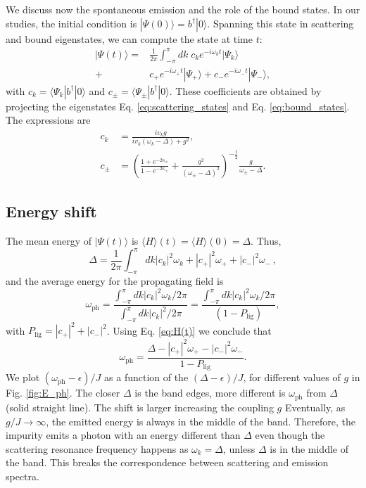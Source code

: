 \documentclass[aps,pra,twocolumn,floatfix,superscriptaddress]{revtex4-1}%
\begin{document}
We discuss now   the spontaneous emission and the role of the bound states.
In our studies, the  initial condition is $|\Psi(0)\rangle = b^\dagger |0\rangle$. Spanning this state in  scattering and bound eigenstates, we can compute the state at time $t$:
\begin{align}
|\Psi(t)\rangle = & \frac{1}{2\pi}\int_{-\pi}^\pi dk\;c_ke^{-i\omega_k t}|\Psi_k\rangle \nonumber \\
 + & c_+ e^{-i\omega_+ t} |\Psi_+\rangle + c_- e^{-i\omega_- t} |\Psi_-\rangle, \label{eq:psi(t)}
\end{align}
with $c_k=\langle\Psi_k|b^\dagger |0\rangle$ and $c_\pm=\langle\Psi_\pm|b^\dagger |0\rangle$. These coefficients are obtained by projecting the eigenstates Eq. \eqref{eq:scattering_states} and Eq. \eqref{eq:bound_states}. The expressions are
\begin{align} \label{eq:ck}
c_k &  = \frac{iv_k g}{iv_k(\omega_k - \Delta) + g^2},\\
\label{eq:cpm}
c_\pm & =  \left(\frac{1+e^{-2\kappa_\pm}}{1-e^{-2\kappa_\pm}}+\frac{g^2}{(\omega_\pm - \Delta)^2}\right)^{-\frac{1}{2}} \frac{g}{\omega_\pm - \Delta}.
\end{align}

\subsection{Energy shift}

The mean energy of $|\Psi(t)\rangle$ is $\langle H\rangle (t) = \langle H\rangle (0) = \Delta$.  Thus, 
\begin{equation}\label{eq:H(t)}
\Delta  = \frac{1}{2\pi}\int_{-\pi}^\pi dk |c_k|^2 \omega_k + |c_+|^2 \omega_+ + |c_-|^2 \omega_- \, ,
\end{equation}
and the  average energy for the propagating field  is
\begin{equation}
\omega_\text{ph} = \frac{\int_{-\pi}^\pi dk |c_k|^2 \omega_k/2\pi}{\int_{-\pi}^\pi dk |c_k|^2/2\pi} = \frac{\int_{-\pi}^\pi dk |c_k|^2 \omega_k/2\pi}{(1-P_\text{lig})},
\end{equation}
with $P_\text{lig} = |c_+|^2 + |c_-|^2$.  
Using Eq. \eqref{eq:H(t)}  we conclude that
\begin{equation}
\omega_\text{ph} =\frac{\Delta - |c_+|^2 \omega_+ - |c_-|^2 \omega_-}{1-P_\text{lig}}. \label{eq:omega_ph}
\end{equation}
We plot $(\omega_\text{ph}-\epsilon)/J$ as a function of the $(\Delta-\epsilon)/J$, for different values of $g$ in Fig. \ref{fig:E_ph}. The closer $\Delta$  is  the band edges, more different is  $\omega_\text{ph}$ from $\Delta$ (solid straight line).
The shift is larger increasing the coupling $g$
Eventually, as $g/J\to\infty$, the emitted energy is always in the middle of the band.
Therefore, the impurity emits a photon with an energy different than $\Delta$ even though the scattering resonance frequency happens as $\omega_k=\Delta$, unless $\Delta$ is in the middle of the band.
This  breaks the correspondence between scattering and emission spectra. 
\end{document}
